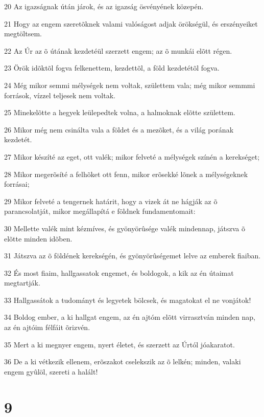 \par 20 Az igazságnak útán járok, és az igazság ösvényének közepén.
\par 21 Hogy az engem szeretõknek valami valóságost adjak örökségül, és erszényeiket megtöltsem.
\par 22 Az Úr az õ útának kezdetéül szerzett engem; az õ munkái elõtt régen.
\par 23 Örök idõktõl fogva felkenettem, kezdettõl, a föld kezdetétõl fogva.
\par 24 Még mikor semmi mélységek nem voltak, születtem vala; még mikor semmmi források, vízzel teljesek nem voltak.
\par 25 Minekelõtte a hegyek leülepedtek volna, a halmoknak elõtte születtem.
\par 26 Mikor még nem csinálta vala a földet és a mezõket, és a világ porának kezdetét.
\par 27 Mikor készíté az eget, ott valék; mikor felveté a mélységek színén a kerekséget;
\par 28 Mikor megerõsíté a felhõket ott fenn, mikor erõsekké lõnek a mélységeknek forrásai;
\par 29 Mikor felveté a tengernek határit, hogy a vizek át ne hágják az õ parancsolatját, mikor megállapítá e földnek fundamentomait:
\par 30 Mellette valék mint kézmíves, és gyönyörûsége valék mindennap, játszva õ elõtte minden idõben.
\par 31 Játszva az õ földének kerekségén, és gyönyörûségemet lelve az emberek fiaiban.
\par 32 És most fiaim, hallgassatok engemet, és boldogok, a kik az én útaimat megtartják.
\par 33 Hallgassátok a tudományt és legyetek bölcsek, és magatokat el ne vonjátok!
\par 34 Boldog ember, a ki hallgat engem, az  én ajtóm elõtt virrasztván minden nap, az én ajtóim félfáit õrizvén.
\par 35 Mert a ki megnyer engem, nyert életet, és szerzett az Úrtól jóakaratot.
\par 36 De a ki vétkezik ellenem, erõszakot cselekszik az õ lelkén; minden, valaki engem gyûlöl, szereti a halált!

\chapter{9}

